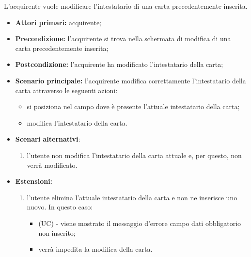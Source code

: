 L'acquirente vuole modificare l'intestatario di una carta precedentemente inserita.
\begin{itemize}
    \item \textbf{Attori primari:} acquirente;
    \item \textbf{Precondizione:} l'acquirente si trova nella schermata di modifica di una carta precedentemente inserita;
    \item \textbf{Postcondizione:} l'acquirente ha modificato l'intestatario della carta;
    \item \textbf{Scenario principale:} l'acquirente modifica correttamente l'intestatario della carta attraverso le seguenti azioni:
    \begin{itemize}
        \item si posiziona nel campo dove è presente l'attuale intestatario della carta;
        \item modifica l'intestatario della carta.
    \end{itemize}
    \item \textbf{Scenari alternativi}:
    \begin{enumerate}[label=\lett]
        \item l'utente non modifica l'intestatario della carta attuale e, per questo, non verrà modificato.
    \end{enumerate}
    \item \textbf{Estensioni:}
    \begin{enumerate}[label=\lett]
        \item l'utente elimina l'attuale intestatario della carta e non ne inserisce uno nuovo. In questo caso:
        \begin{itemize}
            \item (UC) - viene mostrato il messaggio d'errore campo dati obbligatorio non inserito;
            \item verrà impedita la modifica della carta.
        \end{itemize}
    \end{enumerate}
\end{itemize}

